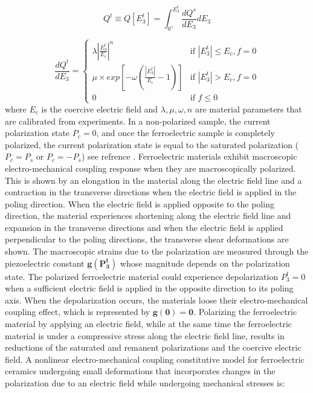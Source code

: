 \begin{equation}
Q^t\equiv Q[E_3^t]= \int_{0^+}^{E_3^t}\frac{d Q^s}{d E_3}{dE_3}
\label{EQN:IrrevePol}
\end{equation}

\begin{equation}
\frac{d Q^t}{d E_3}=
\begin{cases}

\lambda|\frac{E_3^t}{E_c}|^n & \text{if } |E_3^t|\leq E_c, f=0 \\
\mu \times exp[-\omega(\frac{|E_3^t|}{E_c}-1)] & \text{if }|E_3^t|> E_c, f=0 \\ 0
& \text{if } f \leq 0 

\end{cases}
\label{EQN:TimeDepIrrevePol}  
\end{equation}
where $E_c$ is the coercive electric field and $\lambda,\mu,\omega,n$ are material parameters that are calibrated from experiments. 
In a non-polarized sample, the current polarization state $P_c=0$,
 and once the ferroelectric sample is completely polarized, 
the current polarization state is equal to the saturated polarization ($P_c=P_s$ or $P_c=-P_s$) see refrence \cite{Muliana2011}.
Ferroelectric materials exhibit macroscopic electro-mechanical coupling response when they are macroscopically polarized. 
This is shown by an elongation in the material along the electric field line and a contraction in the transverse directions when the electric field is applied in the poling direction. 
When the electric field is applied opposite to the poling direction,
 the material experiences shortening along the electric field line and expansion in the transverse directions and when the electric field is applied perpendicular to the poling directions,
  the transverse shear deformations are shown. 
The macroscopic strains due to the polarization are measured through the piezoelectric constant $\mathbf{g(P^t_3)}$ whose magnitude depends on the polarization state.
The polarized ferroelectric material could experience depolarization $P^t_3=0$ when a sufficient electric field is applied in the opposite direction to its poling axis.
When the depolarization occurs, the materials loose their electro-mechanical coupling effect, which is represented by $\mathbf{g(0)=0}$. 
Polarizing the ferroelectric material by applying an electric field,
 while at the same time the ferroelectric material is under a compressive stress along the electric field line, 
 results in reductions of the saturated and remanent polarizations and the coercive electric field. 
A nonlinear electro-mechanical coupling constitutive model for ferroelectric ceramics undergoing small deformations that
 incorporates changes in the polarization due to an electric field while
 undergoing mechanical stresses is:
 
